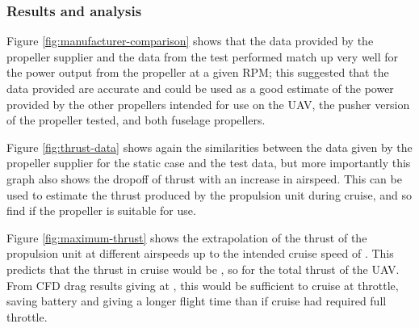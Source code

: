 \documentclass[../../main.tex]{subfiles}
\begin{document}
\subsubsection{Results and analysis} \label{sec:design-process:interim-design-review:motor-and-propellor-test:results-and-analysis}


Figure \ref{fig:manufacturer-comparison} shows that the data provided by the propeller supplier and the data from the test performed match up very well for the power output from the propeller at a given RPM; this suggested that the data provided are accurate and could be used as a good estimate of the power provided by the other propellers intended for use on the UAV, the pusher version of the propeller tested, and both fuselage propellers. 


Figure \ref{fig:thrust-data} shows again the similarities between the data given by the propeller supplier for the static case and the test data, but more importantly this graph also shows the dropoff of thrust with an increase in airspeed.
This can be used to estimate the thrust produced by the propulsion unit during cruise, and so find if the propeller is suitable for use.


Figure \ref{fig:maximum-thrust} shows the extrapolation of the thrust of the propulsion unit at different airspeeds up to the intended cruise speed of .
This predicts that the thrust in cruise would be , so  for the total thrust of the UAV.
From CFD drag results giving  at , this would be sufficient to cruise at  throttle, saving battery and giving a longer flight time than if cruise had required full throttle. 

\end{document}
